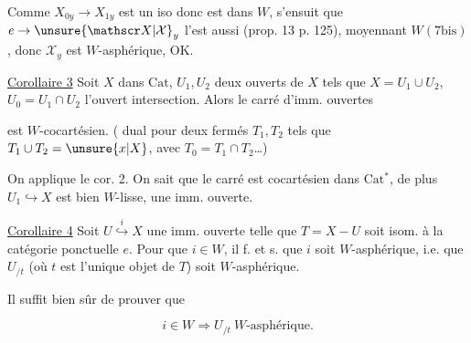 Comme $X_{0y}\longrightarrow X_{1y}$ est un iso donc est dans $W$, s'ensuit que $e\to\unsure{\mathscr X|\mathcal X}_y$ l'est aussi (prop. 13 p. 125), moyennant $W(7\mathrm{bis})$, donc $\mathscr X_y$ est $W$-asphérique, OK.


\uline{Corollaire 3}  Soit $X$ dans $\mathrm{Cat}$, $U_1,U_2$ deux ouverts de $X$ tels que $X=U_1\cup U_2$, $U_0=U_1\cap U_2$ l'ouvert intersection. Alors le carré d'imm. ouvertes


est $W$-cocartésien. ( dual pour deux fermés $T_1,T_2$ tels que $T_1\cup T_2=\unsure{x|X}$, avec $T_0=T_1\cap T_2$\ldots)

On applique le cor. 2. On sait que le carré est cocartésien dans $\mathrm{Cat}$${}^{*}$, de plus $U_1\hookrightarrow X$ est bien $W$-lisse,  une imm. ouverte.


\uline{Corollaire 4}  Soit $U\overset{i}{\hookrightarrow}X$ une imm. ouverte telle que $T=X-U$ soit isom. à la catégorie ponctuelle $e$. Pour que $i\in W$, il f. et s. que $i$ soit $W$-asphérique, i.e. que $U_{/t}$  (où $t$ est l'unique objet de $T$) soit $W$-asphérique.


Il suffit bien sûr de prouver que 

\[
i\in W\Longrightarrow U_{/t}\ \text{$W$-asphérique}.
\]

